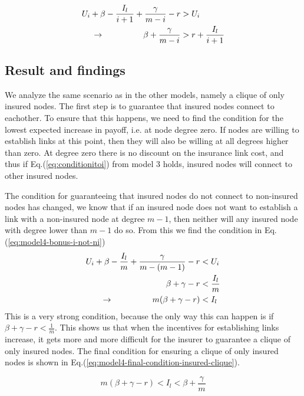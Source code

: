 \begin{eqnarray}
U_{i}+\beta-\frac{I_{l}}{i+1}+\frac{\gamma}{m-i}-r&>U_{i} \nonumber \\ 
\llap{$\rightarrow$\hspace{50pt}}\beta+\frac{\gamma}{m-i}&>r+\frac{I_{l}}{i+1}
\label{eq:model4-bonus-i-to-ni-final}
\end{eqnarray}

\subsection{Result and findings}
We analyze the same scenario as in the other models, namely a clique of only insured nodes. The first step is to guarantee that insured nodes connect to eachother. To ensure that this happens, we need to find the condition for the lowest expected increase in payoff, i.e. at node degree zero. If nodes are willing to establish links at this point, then they will also be willing at all degrees higher than zero.
At degree zero there is no discount on the insurance link cost, and thus if Eq.(\ref{eq:conditionitoi}) from model 3 holds, insured nodes will connect to other insured nodes.

The condition for guaranteeing that insured nodes do not connect to non-insured nodes has changed, we know that if an insured node does not want to establish a link with a non-insured node at degree $m-1$, then neither will any insured node with degree lower than $m-1$ do so. From this we find the condition in Eq.(\ref{eq:model4-bonus-i-not-ni})
\begin{eqnarray}
U_{i}+\beta-\frac{I_{l}}{m}+\frac{\gamma}{m-(m-1)}-r&<U_{i} \nonumber \\ 
\beta+\gamma-r&<\frac{I_{l}}{m}\nonumber \\ 
\llap{$\rightarrow$\hspace{50pt}}m(\beta +\gamma-r)&<I_{l}\nonumber
\label{eq:model4-bonus-i-not-ni}
\end{eqnarray}
This is a very strong condition, because the only way this can happen is if $\beta+\gamma-r<\frac{1}{m}$.  This shows us that when the incentives for establishing links increase, it gets more and more difficult for the insurer to guarantee a clique of only insured nodes. 
The final condition for ensuring a clique of only insured nodes is shown in Eq.(\ref{eq:model4-final-condition-insured-clique}).

\begin{equation}
m(\beta +\gamma-r)<I_{l}<\beta+\frac{\gamma}{m}
\label{eq:model4-final-condition-insured-clique}
\end{equation}

